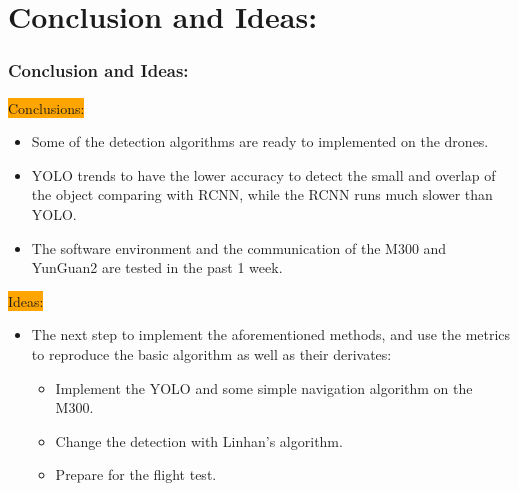 \section{Conclusion and Ideas:}
\begin{frame}
    \frametitle{Conclusion and Ideas:}

    \colorbox{orange}{\Large Conclusions:}
    \normalsize
    \begin{itemize}
        \item Some of the detection algorithms are ready to implemented on the
            drones.
        \item YOLO trends to have the lower accuracy to detect the small and
            overlap of the object comparing with RCNN, while the RCNN runs much
            slower than YOLO.
        \item The software environment and the communication of the M300 and
            YunGuan2 are tested in the past 1 week.
    \end{itemize}
    \colorbox{orange}{\Large Ideas:}
    \normalsize
    \begin{itemize}
        \item The next step to implement the aforementioned methods, and use the
            metrics to reproduce the basic algorithm as well as their derivates:
            \linebreak
            \begin{itemize}
                \item Implement the YOLO and some simple navigation algorithm on
                    the M300.
                \item Change the detection with Linhan's algorithm.
                \item Prepare for the flight test.
            \end{itemize}
    \end{itemize}
\end{frame}


